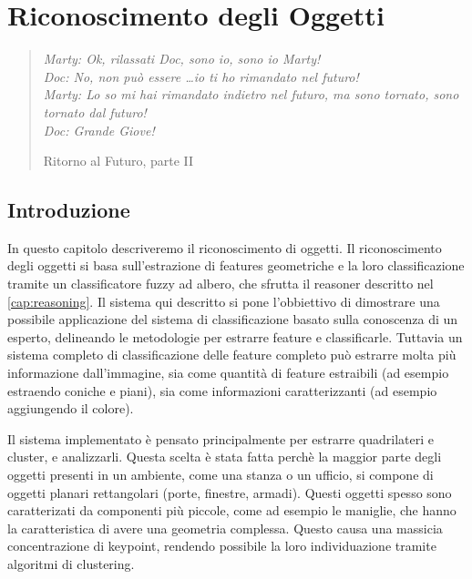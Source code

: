 \chapter{Riconoscimento degli Oggetti}
\label{cap:riconoscimento}
\thispagestyle{empty}

\begin{quotation}
{\footnotesize
\noindent\emph{Marty: Ok, rilassati Doc, sono io, sono io Marty! \\
Doc: No, non può essere \dots io ti ho rimandato nel futuro! \\
Marty: Lo so mi hai rimandato indietro nel futuro, ma sono tornato, sono tornato dal futuro! \\
Doc: Grande Giove!}
\begin{flushright}
Ritorno al Futuro, parte II
\end{flushright}
}
\end{quotation}
\vspace{0.5cm}

\section{Introduzione}

In questo capitolo descriveremo il riconoscimento di oggetti. Il riconoscimento degli oggetti si basa sull'estrazione di features geometriche e la loro classificazione tramite un classificatore fuzzy ad albero, che sfrutta il reasoner descritto nel \autoref{cap:reasoning}.
Il sistema qui descritto si pone l'obbiettivo di dimostrare una possibile applicazione del sistema di classificazione basato sulla conoscenza di un esperto, delineando le metodologie per estrarre feature e classificarle. Tuttavia un sistema completo di classificazione delle feature completo può estrarre molta più informazione dall'immagine, sia come quantità di feature estraibili (ad esempio estraendo coniche e piani), sia come informazioni caratterizzanti (ad esempio aggiungendo il colore).

Il sistema implementato è pensato principalmente per estrarre quadrilateri e cluster, e analizzarli. Questa scelta è stata fatta perchè la maggior parte degli oggetti presenti in un ambiente, come una stanza o un ufficio, si compone di oggetti planari rettangolari (porte, finestre, armadi). Questi oggetti spesso sono caratterizati da componenti più piccole, come ad esempio le maniglie, che hanno la caratteristica di avere una geometria complessa. Questo causa una massicia concentrazione di keypoint, rendendo possibile la loro individuazione tramite algoritmi di clustering.

